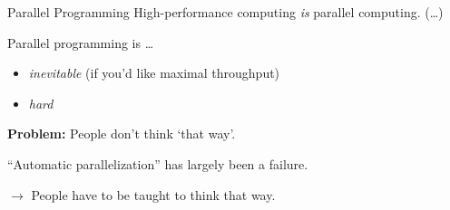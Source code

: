 \documentclass[english,compress]{beamer}
\begin{document}
\begin{frame}{Parallel Programming}
  High-performance computing \emph{is} parallel computing. (\dots)

  \bigskip
  Parallel programming is \dots
  \begin{itemize}
    \item \emph{inevitable} (if you'd like maximal throughput)
    \item \emph{hard}
  \end{itemize}

  \bigskip
  \textbf{Problem:} People don't think `that way'.

  \bigskip
  ``Automatic parallelization'' has largely been a failure.

  \bigskip
  $\rightarrow$ People have to be taught to think that way.
  \hfill {}
\end{frame}
\end{document}
